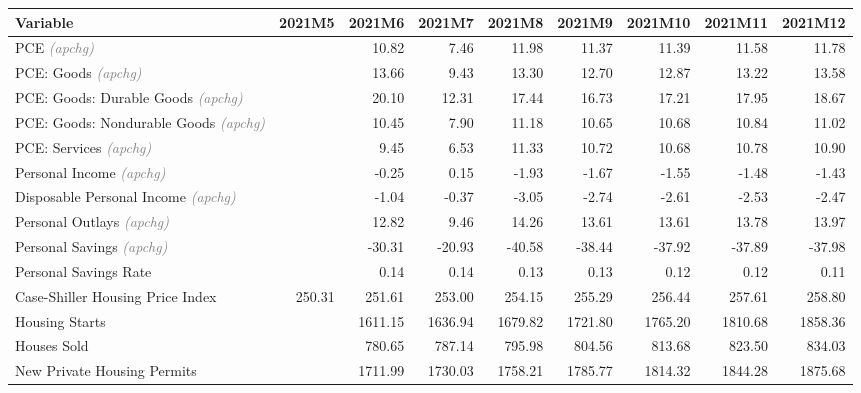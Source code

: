 \documentclass[11pt, letterpaper]{article}\usepackage[]{graphicx}\usepackage[]{color}
\begin{document}
\begin{table}[H]
\centering
\begingroup\fontsize{10pt}{12pt}\selectfont
\begin{tabular}{lrrrrrrrr}
  \hline
Variable & 2021M5 & 2021M6 & 2021M7 & 2021M8 & 2021M9 & 2021M10 & 2021M11 & 2021M12 \\ 
  \hline
PCE \textit{\footnotesize\textcolor{gray}{(apchg)}} &  & 10.82 & 7.46 & 11.98 & 11.37 & 11.39 & 11.58 & 11.78 \\ 
  PCE: Goods \textit{\footnotesize\textcolor{gray}{(apchg)}} &  & 13.66 & 9.43 & 13.30 & 12.70 & 12.87 & 13.22 & 13.58 \\ 
  PCE: Goods: Durable Goods \textit{\footnotesize\textcolor{gray}{(apchg)}} &  & 20.10 & 12.31 & 17.44 & 16.73 & 17.21 & 17.95 & 18.67 \\ 
  PCE: Goods: Nondurable Goods \textit{\footnotesize\textcolor{gray}{(apchg)}} &  & 10.45 & 7.90 & 11.18 & 10.65 & 10.68 & 10.84 & 11.02 \\ 
  PCE: Services \textit{\footnotesize\textcolor{gray}{(apchg)}} &  & 9.45 & 6.53 & 11.33 & 10.72 & 10.68 & 10.78 & 10.90 \\ 
  Personal Income \textit{\footnotesize\textcolor{gray}{(apchg)}} &  & -0.25 & 0.15 & -1.93 & -1.67 & -1.55 & -1.48 & -1.43 \\ 
  Disposable Personal Income \textit{\footnotesize\textcolor{gray}{(apchg)}} &  & -1.04 & -0.37 & -3.05 & -2.74 & -2.61 & -2.53 & -2.47 \\ 
  Personal Outlays \textit{\footnotesize\textcolor{gray}{(apchg)}} &  & 12.82 & 9.46 & 14.26 & 13.61 & 13.61 & 13.78 & 13.97 \\ 
  Personal Savings \textit{\footnotesize\textcolor{gray}{(apchg)}} &  & -30.31 & -20.93 & -40.58 & -38.44 & -37.92 & -37.89 & -37.98 \\ 
  Personal Savings Rate &  & 0.14 & 0.14 & 0.13 & 0.13 & 0.12 & 0.12 & 0.11 \\ 
  Case-Shiller Housing Price Index & 250.31 & 251.61 & 253.00 & 254.15 & 255.29 & 256.44 & 257.61 & 258.80 \\ 
  Housing Starts &  & 1611.15 & 1636.94 & 1679.82 & 1721.80 & 1765.20 & 1810.68 & 1858.36 \\ 
  Houses Sold &  & 780.65 & 787.14 & 795.98 & 804.56 & 813.68 & 823.50 & 834.03 \\ 
  New Private Housing Permits &  & 1711.99 & 1730.03 & 1758.21 & 1785.77 & 1814.32 & 1844.28 & 1875.68 \\ 

\end{tabular}
\end{table}
\end{document}
